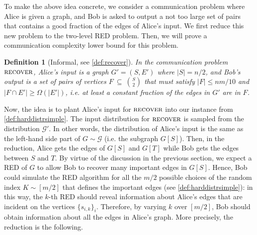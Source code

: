 \documentclass[epsfig,letter,11pt]{article}
\numberwithin{equation}{section}
\newcommand{\card}[1]{|#1|}
\DeclareMathOperator*{\recover}{\textsc{recover}}
\newtheorem{definition}[theorem]{Definition}
\begin{document}
To make the above idea concrete, we consider a communication problem where Alice is given a graph, and Bob is asked to output a not too large set of pairs that contains a good fraction of the edges of Alice's input. We first reduce this new problem to the two-level RED problem. Then, we will prove a communication complexity lower bound for this problem.
\begin{definition}[Informal, see \cref{def:recover}]
	\label{def:recoversimple}
    In the communication problem $\recover$, Alice's input is a graph $G'=(S,E')$ where $\card{S}=n/2$, and Bob's output is a set of pairs of vertices $F~\subseteq~\binom{S}{2}$ that must satisfy $|F| \le nm/10$ and $|F \cap E'| \ge \Omega(|E'|)$, i.e. at least a constant fraction of the edges in $G'$ are in $F$.
\end{definition}

\noindent
Now, the idea is to plant Alice's input for $\recover$ into our instance from \cref{def:harddistrsimple}. The input distribution for $\recover$ is sampled from  the distribution $\mathcal{G}'$. In other words, the distribution of Alice's input is the same as the left-hand side part of $G \sim \mathcal{G}$ (i.e. the subgraph $G[S]$). Then, in the reduction, Alice gets the edges of $G[S]$ and $G[T]$ while Bob gets the edges between $S$ and $T$. By virtue of the discussion in the previous section, we expect a RED of $G$ to allow Bob to recover many important edges in $G[S]$. Hence, Bob could simulate the RED algorithm for all the $m/2$ possible choices of the random index $K \sim [m/2]$ that defines the important edges (see \cref{def:harddistrsimple}): in this way, the $k$-th RED should reveal information about Alice's edges that are incident on the vertices $\{s_{i,k}\}_i$. Therefore, by varying $k$ over $[m/2]$, Bob should obtain information about all the edges in Alice's graph. More precisely, the reduction is the following.
\end{document}
